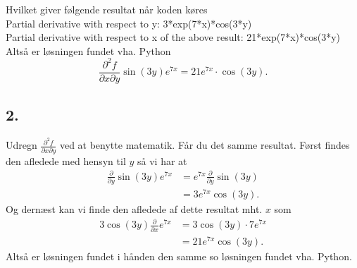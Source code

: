 \documentclass[12pt]{article}
\theoremstyle{definition}
\begin{document}
Hvilket giver følgende resultat når koden køres \\ 
Partial derivative with respect to y: 3*exp(7*x)*cos(3*y) \\
Partial derivative with respect to x of the above result: 21*exp(7*x)*cos(3*y)
\bigbreak
Altså er løsningen fundet vha. Python
\[ 
\frac{\partial^2 f}{\partial x \partial y} \sin(3y)e^{7x} = 21e^{7x} \cdot \cos(3y)
.\]

\subsection*{2.}
Udregn $\frac{\partial^2 f}{\partial x \partial y}$ ved at benytte matematik. Får du det samme resultat. 
\bigbreak
Først findes den afledede med hensyn til $y$ så vi har at
\begin{align*}
  \frac{\partial}{\partial y} \sin(3y)e^{7x} &= e^{7x} \frac{\partial }{\partial y} \sin(3y) \\
  &=  3e^{7x}\cos(3y)
.\end{align*}
Og dernæst kan vi finde den afledede af dette resultat mht. $x$ som
\begin{align*}
  3\cos(3y) \frac{\partial }{\partial x} e^{7x} &= 3 \cos(3y) \cdot 7e^{7x} \\
  &= 21e^{7x}\cos(3y)
.\end{align*}
Altså er løsningen fundet i hånden den samme so løsningen fundet vha. Python. 
\end{document}
